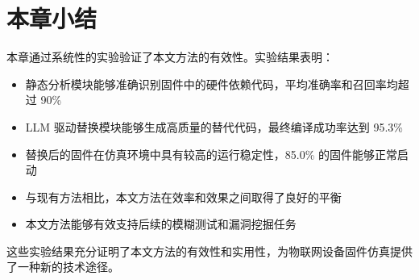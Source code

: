 \section{本章小结}
\label{sec:exp_summary}

本章通过系统性的实验验证了本文方法的有效性。实验结果表明：
\begin{itemize}
    \item 静态分析模块能够准确识别固件中的硬件依赖代码，平均准确率和召回率均超过 90\%
    \item LLM 驱动替换模块能够生成高质量的替代代码，最终编译成功率达到 95.3\%
    \item 替换后的固件在仿真环境中具有较高的运行稳定性，85.0\% 的固件能够正常启动
    \item 与现有方法相比，本文方法在效率和效果之间取得了良好的平衡
    \item 本文方法能够有效支持后续的模糊测试和漏洞挖掘任务
\end{itemize}

这些实验结果充分证明了本文方法的有效性和实用性，为物联网设备固件仿真提供了一种新的技术途径。
